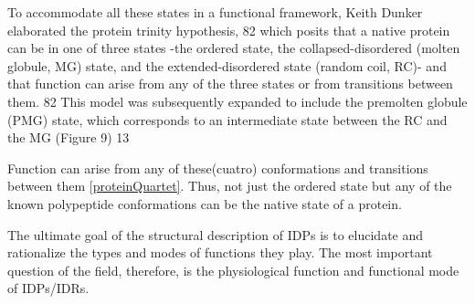 To accommodate all these states in a functional framework, Keith Dunker elaborated the protein trinity hypothesis, 82 which posits that a native protein can be in one of three states -the ordered state, the collapsed-disordered
(molten globule, MG) state, and the extended-disordered state (random coil, RC)- and that function can arise from any of the
three states or from transitions between them. 82 This model was subsequently expanded to include the premolten globule (PMG)
state, which corresponds to an intermediate state between the RC and the MG (Figure 9) 13

Function can arise from any of these(cuatro) conformations and transitions between them \ref{proteinQuartet}. Thus, not just the ordered state but any of the known polypeptide conformations can be the native state of a protein.

The ultimate goal of the structural description of IDPs is to elucidate and rationalize the types and modes of functions they play.
The most important question of the field, therefore, is the physiological function and functional mode of IDPs/IDRs.



